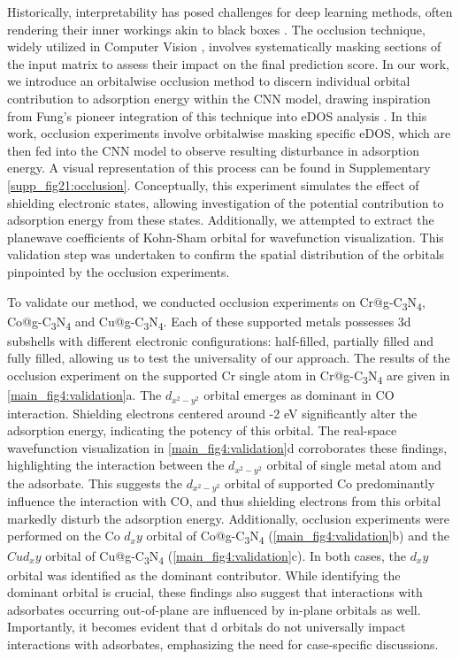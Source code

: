 \documentclass[a4paper, 12pt, titlepage]{article}
\begin{document}
    Historically, interpretability has posed challenges for deep learning methods, often rendering their inner workings akin to black boxes \cite{zhang2018interpretable, zhang2018visual, savage2022breaking}.
    The occlusion technique, widely utilized in Computer Vision \cite{zeiler2014visualizing, kortylewski2020combining, wang2020robust}, involves systematically masking sections of the input matrix to assess their impact on the final prediction score.
    In our work, we introduce an orbitalwise occlusion method to discern individual orbital contribution to adsorption energy within the CNN model, drawing inspiration from Fung's pioneer integration of this technique into eDOS analysis \cite{fung2021machine}.
    In this work, occlusion experiments involve orbitalwise masking specific eDOS, which are then fed into the CNN model to observe resulting disturbance in adsorption energy.
    A visual representation of this process can be found in Supplementary \cref{supp_fig21:occlusion}. Conceptually, this experiment simulates the effect of shielding electronic states, allowing investigation of the potential contribution to adsorption energy from these states.
    Additionally, we attempted to extract the planewave coefficients of Kohn-Sham orbital for wavefunction visualization.
    This validation step was undertaken to confirm the spatial distribution of the orbitals pinpointed by the occlusion experiments.

    To validate our method, we conducted occlusion experiments on Cr@g-C\textsubscript{3}N\textsubscript{4}, Co@g-C\textsubscript{3}N\textsubscript{4} and Cu@g-C\textsubscript{3}N\textsubscript{4}.
    Each of these supported metals possesses 3d subshells with different electronic configurations: half-filled, partially filled and fully filled, allowing us to test the universality of our approach.
    The results of the occlusion experiment on the supported Cr single atom in Cr@g-C\textsubscript{3}N\textsubscript{4} are given in \cref{main_fig4:validation}a.
    The $d_{x^2-y^2}$ orbital emerges as dominant in CO interaction.
    Shielding electrons centered around -2 eV significantly alter the adsorption energy, indicating the potency of this orbital.
    The real-space wavefunction visualization in \cref{main_fig4:validation}d corroborates these findings, highlighting the interaction between the $d_{x^2-y^2}$ orbital of single metal atom and the adsorbate.
    This suggests the $d_{x^2-y^2}$ orbital of supported Co predominantly influence the interaction with CO, and thus shielding electrons from this orbital markedly disturb the adsorption energy.
    Additionally, occlusion experiments were performed on the Co $d_xy$ orbital of Co@g-C\textsubscript{3}N\textsubscript{4} (\cref{main_fig4:validation}b) and the $Cu d_xy$ orbital of Cu@g-C\textsubscript{3}N\textsubscript{4} (\cref{main_fig4:validation}c).
    In both cases, the $d_xy$ orbital was identified as the dominant contributor.
    While identifying the dominant orbital is crucial, these findings also suggest that interactions with adsorbates occurring out-of-plane are influenced by in-plane orbitals as well.
    Importantly, it becomes evident that d orbitals do not universally impact interactions with adsorbates, emphasizing the need for case-specific discussions.
\end{document}
